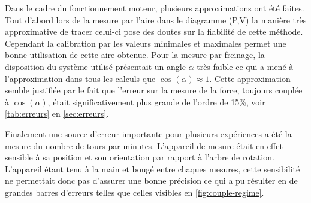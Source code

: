 Dans le cadre du fonctionnement moteur, plusieurs approximations ont été faites. Tout d'abord lors de la mesure par l'aire dans le diagramme (P,V) la manière très approximative de tracer celui-ci pose des doutes sur la fiabilité de cette méthode. Cependant la calibration par les valeurs minimales et maximales permet une bonne utilisation de cette aire obtenue. Pour la mesure par freinage, la disposition du système utilisé présentait un angle \(\alpha\) très faible ce qui a mené à l'approximation dans tous les calculs que \(\cos(\alpha) \approx 1\). Cette approximation semble justifiée par le fait que l'erreur sur la mesure de la force, toujours couplée à \(\cos(\alpha)\), était significativement plus grande de l'ordre de 15\%, voir \autoref{tab:erreurs} en \autoref{sec:erreurs}.

Finalement une source d'erreur importante pour plusieurs expériences a été la mesure du nombre de tours par minutes. L'appareil de mesure était en effet sensible à sa position et son orientation par rapport à l'arbre de rotation. L'appareil étant tenu à la main et bougé entre chaques mesures, cette sensibilité ne permettait donc pas d'assurer une bonne précision ce qui a pu résulter en de grandes barres d'erreurs telles que celles visibles en \autoref{fig:couple-regime}.